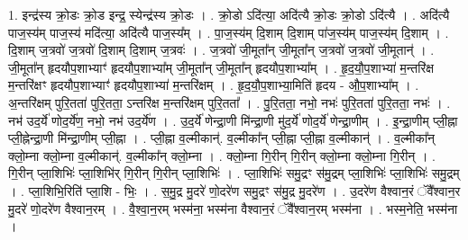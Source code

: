 \documentclass[17pt]{extarticle}
\begin{document}
1. इन्द्र॑स्य क्रो॒डः क्रो॒ड इन्द्र॒ स्येन्द्र॑स्य क्रो॒डः । . क्रो॒डो ऽदि॑त्या॒ अदि॑त्यै क्रो॒डः क्रो॒डो ऽदि॑त्यै । . अदि॑त्यै पाज॒स्य॑म् पाज॒स्य॑ मदि॑त्या॒ अदि॑त्यै पाज॒स्य᳚म् । . पा॒ज॒स्य॑म् दि॒शाम् दि॒शाम् पा॑ज॒स्य॑म् पाज॒स्य॑म् दि॒शाम् । . दि॒शाम् ज॒त्रवो॑ ज॒त्रवो॑ दि॒शाम् दि॒शाम् ज॒त्रवः॑ । . ज॒त्रवो॑ जी॒मूता᳚न् जी॒मूता᳚न् ज॒त्रवो॑ ज॒त्रवो॑ जी॒मूतान्॑ । . जी॒मूता᳚न् हृदयौप॒शाभ्याꣳ॑ हृदयौप॒शाभ्या᳚म् जी॒मूता᳚न् जी॒मूता᳚न् हृदयौप॒शाभ्या᳚म् । . हृ॒द॒यौ॒प॒शाभ्या॑ म॒न्तरि॑क्ष म॒न्तरि॑क्षꣳ हृदयौप॒शाभ्याꣳ॑ हृदयौप॒शाभ्या॑ म॒न्तरि॑क्षम् । . हृ॒द॒यौ॒प॒शाभ्या॒मिति॑ हृदय - औ॒प॒शाभ्या᳚म् । . अ॒न्तरि॑क्षम् पुरि॒तता॑ पुरि॒तता॒ ऽन्तरि॑क्ष म॒न्तरि॑क्षम् पुरि॒तता᳚ । . पु॒रि॒तता॒ नभो॒ नभः॑ पुरि॒तता॑ पुरि॒तता॒ नभः॑ । . नभ॑ उद॒र्ये॑ णोद॒र्ये॑ण॒ नभो॒ नभ॑ उद॒र्ये॑ण । . उ॒द॒र्ये॑ णेन्द्रा॒णी मि॑न्द्रा॒णी मु॑द॒र्ये॑ णोद॒र्ये॑ णेन्द्रा॒णीम् । . इ॒न्द्रा॒णीम् प्ली॒ह्ना प्ली॒ह्नेन्द्रा॒णी मि॑न्द्रा॒णीम् प्ली॒ह्ना । . प्ली॒ह्ना व॒ल्मीकान्॑. व॒ल्मीका᳚न् प्ली॒ह्ना प्ली॒ह्ना व॒ल्मीकान्॑ । . व॒ल्मीका᳚न् क्लो॒म्ना क्लो॒म्ना व॒ल्मीकान्॑. व॒ल्मीका᳚न् क्लो॒म्ना । . क्लो॒म्ना गि॒रीन् गि॒रीन् क्लो॒म्ना क्लो॒म्ना गि॒रीन् । . गि॒रीन् प्ला॒शिभिः॑ प्ला॒शिभि॑र् गि॒रीन् गि॒रीन् प्ला॒शिभिः॑ । . प्ला॒शिभिः॑ समु॒द्रꣳ स॑मु॒द्रम् प्ला॒शिभिः॑ प्ला॒शिभिः॑ समु॒द्रम् । . प्ला॒शिभि॒रिति॑ प्ला॒शि - भिः॒ । . स॒मु॒द्र मु॒दरे॑ णो॒दरे॑ण समु॒द्रꣳ स॑मु॒द्र मु॒दरे॑ण । . उ॒दरे॑ण वैश्वान॒रं ॅवै᳚श्वान॒र मु॒दरे॑ णो॒दरे॑ण वैश्वान॒रम् । . वै॒श्वा॒न॒रम् भस्म॑ना॒ भस्म॑ना वैश्वान॒रं ॅवै᳚श्वान॒रम् भस्म॑ना । . भस्म॒नेति॒ भस्म॑ना । \newline
\end{document}
